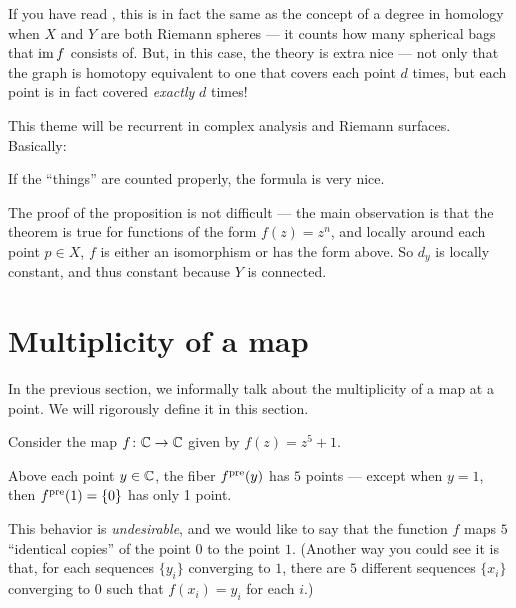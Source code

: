 If you have read ,
this is in fact the same as the concept of a degree in homology when $X$ and $Y$ are both Riemann
spheres --- it counts how many spherical bags that $\operatorname{im} f$ consists of.
But, in this case, the theory is extra nice --- not only that the graph is homotopy equivalent to
one that covers each point $d$ times, but each point is in fact covered \emph{exactly} $d$ times!

This theme will be recurrent in complex analysis and Riemann surfaces. Basically:
\begin{moral}
	If the ``things'' are counted properly, the formula is very nice.
\end{moral}


The proof of the proposition is not difficult --- the main observation is that the theorem is true
for functions of the form $f(z) = z^n$, and locally around each point $p \in X$, $f$ is either an
isomorphism or has the form above.
So $d_y$ is locally constant, and thus constant because $Y$ is connected.


\section{Multiplicity of a map}

In the previous section, we informally talk about the multiplicity of a map at a point. We will
rigorously define it in this section.

\begin{example}
	Consider the map $f \colon \mathbb C \to \mathbb C$ given by $f(z) = z^5 + 1$.

	Above each point $y \in \mathbb C$, the fiber $f^{\text{pre}}(y)$ has $5$ points --- except when $y = 1$, then
	$f^{\text{pre}}(1) = \{ 0 \}$ has only 1 point.
\end{example}

This behavior is \emph{undesirable}, and we would like to say that the function $f$ maps $5$
``identical copies'' of the point $0$ to the point $1$.
(Another way you could see it is that, for each sequences $\{ y_i \}$ converging to $1$, there are
$5$ different sequences $\{ x_i \}$ converging to $0$ such that $f(x_i) = y_i$ for each $i$.)

